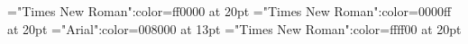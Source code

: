 \documentclass[a4paper]{article}
\begin{document}
 
\pagestyle{plain} 
\font\ta="Times New Roman":color=ff0000 at 20pt
\font\tbta="Times New Roman":color=0000ff at 20pt
\font\tctbta="Arial":color=008000 at 13pt
\font\tdta="Times New Roman":color=ffff00 at 20pt

\pagestyle{fancy} 






\end{document}

